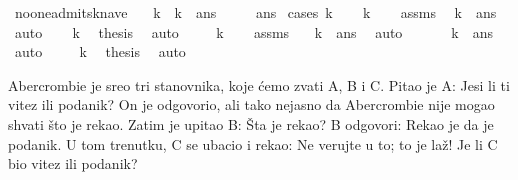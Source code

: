 \begin{isabellebody}
\begin{exercise}[subtitle=Logčki lavirinti.]
\begin{isamarkuptext}
\end{isamarkuptext}\isamarkuptrue%
\isamarkupfalse%
\ no{\isacharunderscore}{\kern0pt}one{\isacharunderscore}{\kern0pt}admits{\isacharunderscore}{\kern0pt}knave{\isacharcolon}{\kern0pt}\isanewline
\ \ \ {\isachardoublequoteopen}k\ {\isasymlongleftrightarrow}\ {\isacharparenleft}{\kern0pt}k\ {\isasymlongleftrightarrow}\ ans{\isacharparenright}{\kern0pt}{\isachardoublequoteclose}\isanewline
\ \ \ \ \ ans\isanewline
%
\isadelimproof
%
\endisadelimproof
%
\isatagproof
{}\isamarkupfalse%
\ {\isacharparenleft}{\kern0pt}cases\ k{\isacharparenright}{\kern0pt}\isanewline
\ \ \isamarkupfalse%
\ k\isanewline
\ \ \isamarkupfalse%
\ assms\ \isamarkupfalse%
\ {\isachardoublequoteopen}k\ {\isasymlongleftrightarrow}\ ans{\isachardoublequoteclose}\ \ \isamarkupfalse%
\ auto\isanewline
\ \ \isamarkupfalse%
\ {\isacartoucheopen}k{\isacartoucheclose}\ \isamarkupfalse%
\ {\isacharquery}{\kern0pt}thesis\ \isamarkupfalse%
\ auto\isanewline
{}\isamarkupfalse%
\isanewline
\ \ \isamarkupfalse%
\ {\isachardoublequoteopen}{\isasymnot}\ k{\isachardoublequoteclose}\isanewline
\ \ \isamarkupfalse%
\ assms\ \isamarkupfalse%
\ {\isachardoublequoteopen}{\isasymnot}\ {\isacharparenleft}{\kern0pt}k\ {\isasymlongleftrightarrow}\ ans{\isacharparenright}{\kern0pt}{\isachardoublequoteclose}\ \isamarkupfalse%
\ auto\isanewline
\ \ \isamarkupfalse%
\ \isamarkupfalse%
\ {\isachardoublequoteopen}{\isasymnot}\ k\ {\isasymlongrightarrow}\ ans{\isachardoublequoteclose}\ \isamarkupfalse%
\ auto\isanewline
\ \ \isamarkupfalse%
\ {\isacartoucheopen}{\isasymnot}\ k{\isacartoucheclose}\ \isamarkupfalse%
\ {\isacharquery}{\kern0pt}thesis\ \isamarkupfalse%
\ auto\isanewline
{}\isamarkupfalse%
%
\endisatagproof
{\isafoldproof}%
%
\isadelimproof
%
\endisadelimproof
%
\begin{isamarkuptext}%
Abercrombie je sreo tri stanovnika, koje ćemo zvati A, B i C. 
      Pitao je A: Jesi li ti vitez ili podanik?
      On je odgovorio, ali tako nejasno da Abercrombie nije mogao shvati 
      što je rekao. 
      Zatim je upitao B: Šta je rekao? 
      B odgovori: Rekao je da je podanik.
      U tom trenutku, C se ubacio i rekao: Ne verujte u to; to je laž! 
      Je li C bio vitez ili podanik?%

\end{isamarkuptext}
\end{exercise}
\end{isabellebody}
